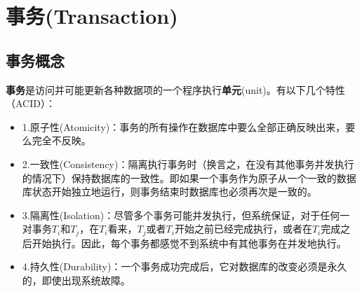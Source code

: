 \chapter{事务(Transaction)}
\section{事务概念}
\begin{flushleft}
\textbf{事务}是访问并可能更新各种数据项的一个程序执行\textbf{单元}(unit)。有以下几个特性（ACID）：\\
\end{flushleft}

\begin{itemize}
  \item 1.原子性(Atomicity)：事务的所有操作在数据库中要么全部正确反映出来，要么完全不反映。
  \item 2.一致性(Consistency)：隔离执行事务时（换言之，在没有其他事务并发执行的情况下）保持数据库的一致性。即如果一个事务作为原子从一个一致的数据库状态开始独立地运行，则事务结束时数据库也必须再次是一致的。
  \item 3.隔离性(Isolation)：尽管多个事务可能并发执行，但系统保证，对于任何一对事务$T_{i}$和$T_{j}$，在$T_{i}$看来，$T_{j}$或者$T_{i}$开始之前已经完成执行，或者在$T_{i}$完成之后开始执行。因此，每个事务都感觉不到系统中有其他事务在并发地执行。
  \item 4.持久性(Durability)：一个事务成功完成后，它对数据库的改变必须是永久的，即使出现系统故障。
\end{itemize}



